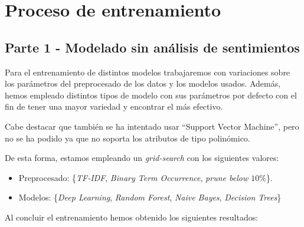 \documentclass[12pt]{report} %
\begin{document}
\chapter{Proceso de entrenamiento}
\label{chap:train}

\section{Parte 1 - Modelado sin análisis de sentimientos}
\label{sec:parte1}

    Para el entrenamiento de distintos modelos trabajaremos con variaciones
    sobre los parámetros del preprocesado de los datos y los modelos usados.
    Además, hemos empleado distintos tipos de modelo con sus
    parámetros por defecto con el fin de tener una mayor variedad y encontrar
    el más efectivo.

    Cabe destacar que también se ha intentado usar ``Support Vector Machine'',
    pero no se ha podido ya que no soporta los atributos de tipo polinómico.

    De esta forma, estamos empleando un \textit{grid-search} con los siguientes valores:
    \begin{itemize}
        \item Preprocesado: \{\textit{TF-IDF}, \textit{Binary Term Occurrence}, \textit{prune below $10\%$}\}.
        \item Modelos: \{\textit{Deep Learning}, \textit{Random Forest}, \textit{Naive Bayes}, \textit{Decision Trees}\}
    \end{itemize}

    Al concluir el entrenamiento hemos obtenido los siguientes resultados:
\end{document}
